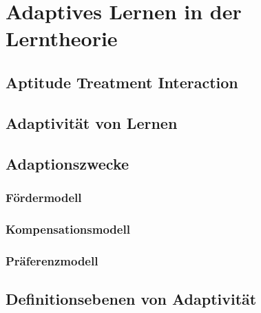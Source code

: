 \chapter{Adaptives Lernen in der Lerntheorie}

\section{Aptitude Treatment Interaction}

\section{Adaptivität von Lernen}

\section{Adaptionszwecke}

\subsection{Fördermodell}

\subsection{Kompensationsmodell}

\subsection{Präferenzmodell}

\section{Definitionsebenen von Adaptivität}
